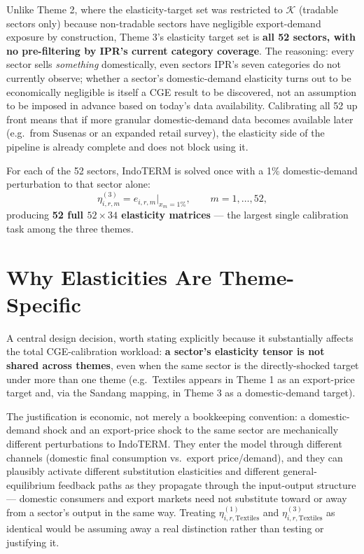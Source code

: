 \documentclass[11pt]{article}
\begin{document}
\begin{decisionbox}
Unlike Theme 2, where the elasticity-target set was restricted to
$\mathcal{K}$ (tradable sectors only) because non-tradable sectors have
negligible export-demand exposure by construction, Theme 3's elasticity
target set is \textbf{all 52 sectors, with no pre-filtering by IPR's current
category coverage}. The reasoning: every sector sells \emph{something}
domestically, even sectors IPR's seven categories do not currently observe;
whether a sector's domestic-demand elasticity turns out to be economically
negligible is itself a CGE result to be discovered, not an assumption to be
imposed in advance based on today's data availability. Calibrating all 52
up front means that if more granular domestic-demand data becomes available
later (e.g.\ from Susenas or an expanded retail survey), the elasticity side
of the pipeline is already complete and does not block using it.
\end{decisionbox}

For each of the 52 sectors, IndoTERM is solved once with a 1\%
domestic-demand perturbation to that sector alone:
\begin{equation}
  \eta_{i,r,m}^{(3)} = e_{i,r,m}\Big|_{x_m = 1\%}, \qquad m = 1,\dots,52,
\end{equation}
producing \textbf{52 full $52\times34$ elasticity matrices} --- the largest
single calibration task among the three themes.

\section{Why Elasticities Are Theme-Specific}
\label{sec:elasticity-scope}

A central design decision, worth stating explicitly because it substantially
affects the total CGE-calibration workload: \textbf{a sector's elasticity
tensor is not shared across themes}, even when the same sector is the
directly-shocked target under more than one theme (e.g.\ Textiles appears in
Theme 1 as an export-price target and, via the Sandang mapping, in Theme 3
as a domestic-demand target).

The justification is economic, not merely a bookkeeping convention: a
domestic-demand shock and an export-price shock to the same sector are
mechanically different perturbations to IndoTERM. They enter the model
through different channels (domestic final consumption vs.\ export
price/demand), and they can plausibly activate different substitution
elasticities and different general-equilibrium feedback paths as they
propagate through the input-output structure --- domestic consumers and
export markets need not substitute toward or away from a sector's output in
the same way. Treating $\eta^{(1)}_{i,r,\text{Textiles}}$ and
$\eta^{(3)}_{i,r,\text{Textiles}}$ as identical would be assuming away a real
distinction rather than testing or justifying it.
\end{document}

